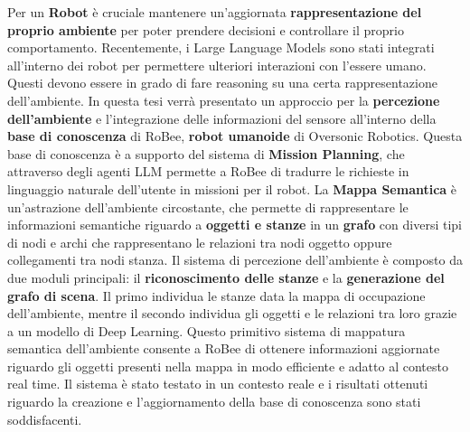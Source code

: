 Per un \textbf{Robot} è cruciale mantenere un'aggiornata \textbf{rappresentazione del proprio ambiente} per poter prendere decisioni e controllare il proprio comportamento. Recentemente, i Large Language Models sono stati integrati all'interno dei robot per permettere ulteriori interazioni con l'essere umano. Questi devono essere in grado di fare reasoning su una certa rappresentazione dell'ambiente.
In questa tesi verrà presentato un approccio per la \textbf{percezione dell'ambiente} e l'integrazione delle informazioni del sensore all'interno della \textbf{base di conoscenza} di RoBee, \textbf{robot umanoide} di Oversonic Robotics. Questa base di conoscenza è a supporto del sistema di \textbf{Mission Planning}, che attraverso degli agenti LLM permette a RoBee di tradurre le richieste in linguaggio naturale dell'utente in missioni per il robot.
La \textbf{Mappa Semantica} è un'astrazione dell'ambiente circostante, che permette di rappresentare le informazioni semantiche riguardo a \textbf{oggetti e stanze} in un \textbf{grafo} con diversi tipi di nodi e archi che rappresentano le relazioni tra nodi oggetto oppure collegamenti tra nodi stanza.
Il sistema di percezione dell'ambiente è composto da due moduli principali: il \textbf{riconoscimento delle stanze} e la \textbf{generazione del grafo di scena}. Il primo individua le stanze data la mappa di occupazione dell'ambiente, mentre il secondo individua gli oggetti e le relazioni tra loro grazie a un modello di Deep Learning.
Questo primitivo sistema di mappatura semantica dell'ambiente consente a RoBee di ottenere informazioni aggiornate riguardo gli oggetti presenti nella mappa in modo efficiente e adatto al contesto real time.
Il sistema è stato testato in un contesto reale e i risultati ottenuti riguardo la creazione e l'aggiornamento della base di conoscenza sono stati soddisfacenti.